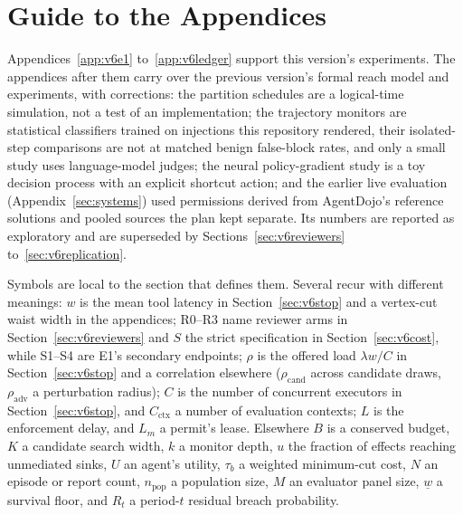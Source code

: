 \section{Guide to the Appendices}\label{app:guide}

Appendices~\ref{app:v6e1} to~\ref{app:v6ledger} support this version's experiments. The appendices after them carry
over the previous version's formal reach model and experiments, with corrections: the partition schedules are a
logical-time simulation, not a test of an implementation; the trajectory monitors are statistical classifiers trained on injections this repository rendered, their
isolated-step comparisons are not at matched benign false-block rates, and only a small study uses language-model
judges; the neural policy-gradient study is a toy decision process with an explicit shortcut action; and the earlier
live evaluation (Appendix~\ref{sec:systems}) used permissions derived from AgentDojo's reference solutions and pooled
sources the plan kept separate. Its numbers are reported as exploratory and are superseded by
Sections~\ref{sec:v6reviewers} to~\ref{sec:v6replication}.


Symbols are local to the section that defines them. Several recur with different meanings: \(w\) is the mean tool latency in Section~\ref{sec:v6stop} and a vertex-cut waist width in the appendices; R0--R3 name reviewer arms in Section~\ref{sec:v6reviewers} and \(S\) the strict specification in Section~\ref{sec:v6cost}, while S1--S4 are E1's secondary endpoints; \(\rho\) is the offered load \(\lambda w / C\) in Section~\ref{sec:v6stop} and a correlation elsewhere (\(\rho_{\mathrm{cand}}\) across candidate draws, \(\rho_{\mathrm{adv}}\) a perturbation radius); \(C\) is the number of concurrent executors in Section~\ref{sec:v6stop}, and \(C_{\mathrm{ctx}}\) a number of evaluation contexts; \(L\) is the enforcement delay, and \(L_m\) a permit's lease. Elsewhere \(B\) is a conserved budget, \(K\) a candidate search width, \(k\) a monitor depth, \(u\) the fraction of effects reaching unmediated sinks, \(U\) an agent's utility, \(\tau_b\) a weighted minimum-cut cost, \(N\) an episode or report count, \(n_{\mathrm{pop}}\) a population size, \(M\) an evaluator panel size, \(\underline{w}\) a survival floor, and \(R_t\) a period-\(t\) residual breach probability.
